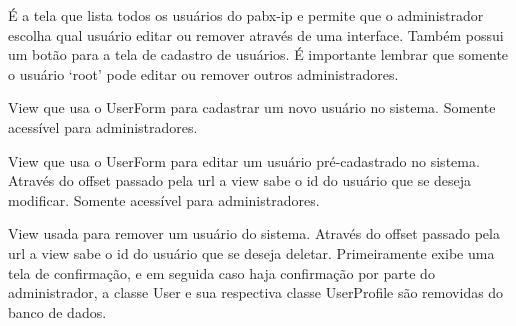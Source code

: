 \documentclass[letterpaper,10pt,brazil]{sphinxmanual}
\begin{document}

\begin{fulllineitems}
\label{apps/accounts:accounts.views.settings}
É a tela que lista todos os usuários do pabx-ip e permite que o administrador escolha qual usuário editar ou remover através de uma interface. Também possui um botão para a tela de cadastro de usuários. É importante lembrar que somente o usuário `root' pode editar ou remover outros administradores.

\end{fulllineitems}


\begin{fulllineitems}
\label{apps/accounts:accounts.views.create}
View que usa o UserForm para cadastrar um novo usuário no sistema. Somente acessível para administradores.

\end{fulllineitems}


\begin{fulllineitems}
\label{apps/accounts:accounts.views.edit}
View que usa o UserForm para editar um usuário pré-cadastrado no sistema. Através do offset passado pela url a view sabe o id do usuário que se deseja modificar. Somente acessível para administradores.

\end{fulllineitems}


\begin{fulllineitems}
\label{apps/accounts:accounts.views.delete}
View usada para remover um usuário do sistema. Através do offset passado pela url a view sabe o id do usuário que se deseja deletar. Primeiramente exibe uma tela de confirmação, e em seguida caso haja confirmação por parte do administrador, a classe User e sua respectiva classe UserProfile são removidas do banco de dados.

\end{fulllineitems}
\end{document}
